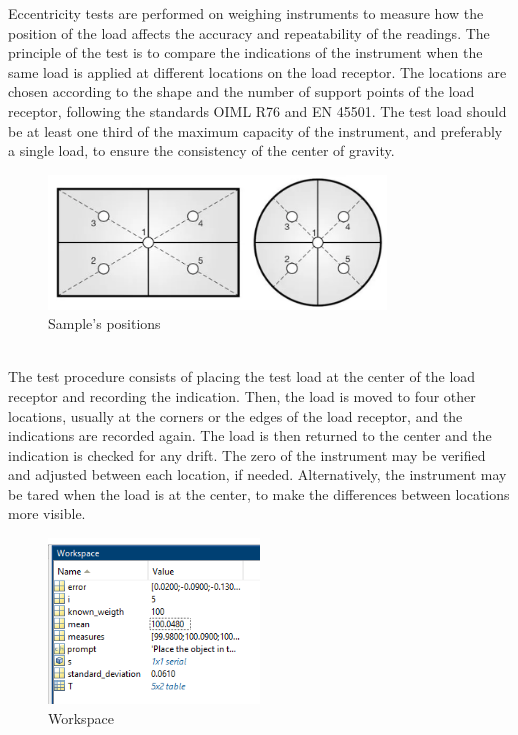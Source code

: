Eccentricity tests are performed on weighing instruments to measure how the position of the load affects the accuracy and repeatability of the readings. The principle of the test is to compare the indications of the instrument when the same load is applied at different locations on the load receptor. The locations are chosen according to the shape and the number of support points of the load receptor, following the standards OIML R76 and EN 45501. The test load should be at least one third of the maximum capacity of the instrument, and preferably a single load, to ensure the consistency of the center of gravity.\\
\begin{figure}[h]
    \centering
    \includegraphics[width=0.8\textwidth]{medias/Scale_positions.png}
    \caption{Sample's positions}
    \label{fig:enter-label}
\end{figure}
\\
The test procedure consists of placing the test load at the center of the load receptor and recording the indication. Then, the load is moved to four other locations, usually at the corners or the edges of the load receptor, and the indications are recorded again. The load is then returned to the center and the indication is checked for any drift. The zero of the instrument may be verified and adjusted between each location, if needed. Alternatively, the instrument may be tared when the load is at the center, to make the differences between locations more visible. 
\clearpage

\begin{figure}[h]
    \centering
    \includegraphics[width=0.5\textwidth]{medias/test/post/eccentricity.png}
    \caption{Workspace}
    \label{fig:enter-label}
\end{figure}


